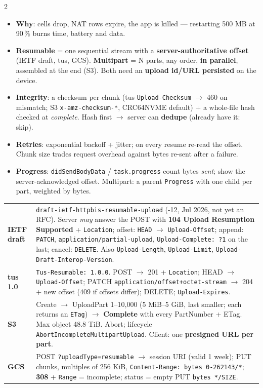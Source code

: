 \documentclass[8pt]{extarticle}
\newcommand\ct[1]{\texttt{#1}}
\newcommand\hd[1]{\par\vspace{3pt}\noindent{\bfseries\color{sheetBlue}#1}\par\vspace{1pt}}
\begin{document}
\begin{multicols}{2}
\raggedright{}

\hd{How it works}
\begin{itemize}
  \item \textbf{Why}: cells drop, NAT rows expire, the app is killed — restarting 500 MB at 90\,\%
        burns time, battery and data.
  \item \textbf{Resumable} = one sequential stream with a \textbf{server-authoritative offset}
        (IETF draft, tus, GCS). \textbf{Multipart} = N parts, any order, \textbf{in parallel},
        assembled at the end (S3). Both need an \textbf{upload id/URL persisted} on the device.
  \item \textbf{Integrity}: a checksum per chunk (tus \ct{Upload-Checksum} $\to$ 460 on mismatch;
        S3 \ct{x-amz-checksum-*}, CRC64NVME default) + a whole-file hash checked at
        \emph{complete}. Hash first $\to$ server can \textbf{dedupe} (already have it: skip).
  \item \textbf{Retries}: exponential backoff + jitter; on every resume re-read the offset. Chunk
        size trades request overhead against bytes re-sent after a failure.
  \item \textbf{Progress}: \ct{didSendBodyData} / \ct{task.progress} count bytes \emph{sent};
        show the server-acknowledged offset. Multipart: a parent \ct{Progress} with one child
        per part, weighted by bytes.
\end{itemize}

\hd{The protocols}
{\footnotesize
\begin{tabular}{@{}>{\raggedright\arraybackslash}p{12mm}>{\raggedright\arraybackslash}p{61mm}@{}}
\toprule
\textbf{IETF draft} & \ct{draft-ietf-httpbis-resumable-upload} (-12, Jul 2026, not yet an RFC).
  Server \emph{may} answer the POST with \textbf{104 Upload Resumption Supported} + \ct{Location};
  offset: \ct{HEAD} $\to$ \ct{Upload-Offset}; append: \ct{PATCH}, \ct{application/partial-upload},
  \ct{Upload-Complete: ?1} on the last; cancel: \ct{DELETE}. Also \ct{Upload-Length},
  \ct{Upload-Limit}, \ct{Upload-Draft-Interop-Version}. \\
\textbf{tus 1.0} & \ct{Tus-Resumable: 1.0.0}. POST $\to$ 201 + \ct{Location}; HEAD $\to$ \ct{Upload-Offset};
  PATCH \ct{application/offset+octet-stream} $\to$ 204 + new offset (409 if offsets differ);
  DELETE; \ct{Upload-Expires}. \\
\textbf{S3} & Create $\to$ UploadPart 1–10{,}000 (5 MiB–5 GiB, last smaller; each returns an
  \ct{ETag}) $\to$ \textbf{Complete} with every PartNumber + ETag. Max object 48.8 TiB. Abort;
  lifecycle \ct{AbortIncompleteMultipartUpload}. Client: one \textbf{presigned URL per part}. \\
\textbf{GCS} & POST \ct{?uploadType=resumable} $\to$ session URI (valid 1 week); PUT chunks, multiples of
  256 KiB, \ct{Content-Range: bytes 0-262143/*}; \textbf{308} + \ct{Range} = incomplete; status =
  empty PUT \ct{bytes */SIZE}. \\
\bottomrule
\end{tabular}}


\end{multicols}
\end{document}
